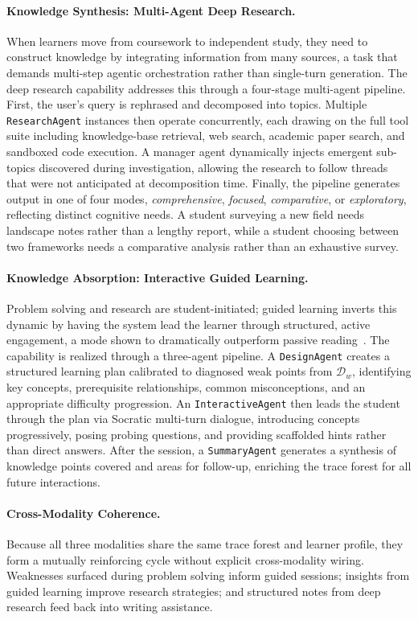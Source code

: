 \paragraph{Knowledge Synthesis: Multi-Agent Deep Research.}
When learners move from coursework to independent study, they need to construct knowledge by integrating information from many sources, a task that demands multi-step agentic orchestration rather than single-turn generation.
The deep research capability addresses this through a four-stage multi-agent pipeline.
First, the user's query is rephrased and decomposed into topics.
Multiple \texttt{ResearchAgent} instances then operate concurrently, each drawing on the full tool suite including knowledge-base retrieval, web search, academic paper search, and sandboxed code execution.
A manager agent dynamically injects emergent sub-topics discovered during investigation, allowing the research to follow threads that were not anticipated at decomposition time.
Finally, the pipeline generates output in one of four modes, \emph{comprehensive}, \emph{focused}, \emph{comparative}, or \emph{exploratory}, reflecting distinct cognitive needs. A student surveying a new field needs landscape notes rather than a lengthy report, while a student choosing between two frameworks needs a comparative analysis rather than an exhaustive survey.

\paragraph{Knowledge Absorption: Interactive Guided Learning.}
Problem solving and research are student-initiated; guided learning inverts this dynamic by having the system lead the learner through structured, active engagement, a mode shown to dramatically outperform passive reading~\citep{freeman2014active}.
The capability is realized through a three-agent pipeline.
A \texttt{DesignAgent} creates a structured learning plan calibrated to diagnosed weak points from $\mathcal{D}_w$, identifying key concepts, prerequisite relationships, common misconceptions, and an appropriate difficulty progression.
An \texttt{InteractiveAgent} then leads the student through the plan via Socratic multi-turn dialogue, introducing concepts progressively, posing probing questions, and providing scaffolded hints rather than direct answers.
After the session, a \texttt{SummaryAgent} generates a synthesis of knowledge points covered and areas for follow-up, enriching the trace forest for all future interactions.

\paragraph{Cross-Modality Coherence.}
Because all three modalities share the same trace forest and learner profile, they form a mutually reinforcing cycle without explicit cross-modality wiring.
Weaknesses surfaced during problem solving inform guided sessions; insights from guided learning improve research strategies; and structured notes from deep research feed back into writing assistance.
